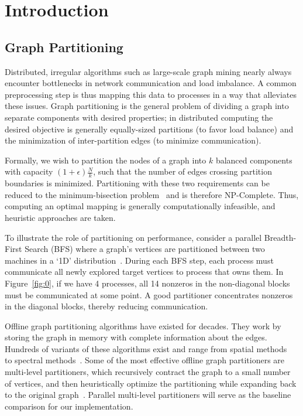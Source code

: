 \section{Introduction}
\subsection{Graph Partitioning}
Distributed, irregular algorithms such as large-scale graph mining nearly always encounter bottlenecks in network communication and load imbalance. A common preprocessing step is thus mapping this data to processes in a way that alleviates these issues. Graph partitioning is the general problem of dividing a graph into separate components with desired properties; in distributed computing the desired objective is generally equally-sized partitions (to favor load balance) and the minimization of inter-partition edges (to minimize communication).

Formally, we wish to partition the nodes of a graph into $k$ balanced components with capacity $(1+\epsilon)\frac{N}{k}$, such that the number of edges crossing partition boundaries is minimized. Partitioning with these two requirements can be reduced to the minimum-bisection problem~\cite{Garey:1979:CIG:578533} and is therefore NP-Complete. Thus, computing an optimal mapping is generally computationally infeasible, and heuristic approaches are taken. 

To illustrate the role of partitioning on performance, consider a parallel Breadth-First Search (BFS) where a graph's vertices are partitioned between two machines in a `1D' distribution~\cite{}. During each BFS step, each process must communicate all newly explored target vertices to process that owns them. In Figure~\ref{fig:0}, if we have 4 processes, all 14 nonzeros in the non-diagonal blocks must be communicated at some point.
A good partitioner concentrates nonzeros in the diagonal blocks, thereby reducing communication.

Offline graph partitioning algorithms have existed for decades. They work by storing the graph in memory with complete information about the edges. Hundreds of variants of these algorithms exist and range from spatial methods~\cite{Gilbert95geometricmesh} to spectral methods~\cite{arora2009expander}. Some of the most effective offline graph partitioners are multi-level partitioners, which recursively contract the graph to a small number of vertices, and then heuristically optimize the partitioning while expanding back to the original graph~\cite{karypis1998multilevel}. Parallel multi-level partitioners will serve as the baseline comparison for our implementation. 


